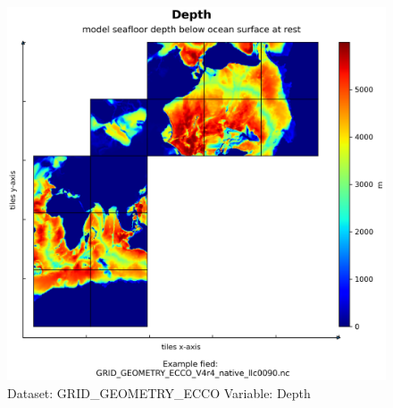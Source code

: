 \begin{figure}[H]
\centering
\includegraphics[width=\textwidth]{../images/plots/native_plots_coords/Geometry_Parameters_for_the_Lat-Lon-Cap_90_(llc90)_Native_Model_Grid_(Version_4_Release_4)/Depth.png}
\caption{Dataset: GRID\_GEOMETRY\_ECCO Variable: Depth}
\label{tab:table-GRID_GEOMETRY_ECCO_Depth-Plot}
\end{figure}
\pagebreak
